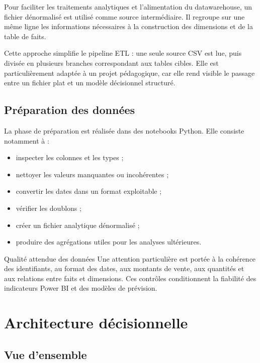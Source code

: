 \documentclass[12pt,a4paper,twoside]{report}
\begin{document}
Pour faciliter les traitements analytiques et l'alimentation du datawarehouse, un fichier dénormalisé est utilisé comme source intermédiaire. Il regroupe sur une même ligne les informations nécessaires à la construction des dimensions et de la table de faits.

Cette approche simplifie le pipeline ETL : une seule source CSV est lue, puis divisée en plusieurs branches correspondant aux tables cibles. Elle est particulièrement adaptée à un projet pédagogique, car elle rend visible le passage entre un fichier plat et un modèle décisionnel structuré.

\section{Préparation des données}

La phase de préparation est réalisée dans des notebooks Python. Elle consiste notamment à :

\begin{itemize}
  \item inspecter les colonnes et les types ;
  \item nettoyer les valeurs manquantes ou incohérentes ;
  \item convertir les dates dans un format exploitable ;
  \item vérifier les doublons ;
  \item créer un fichier analytique dénormalisé ;
  \item produire des agrégations utiles pour les analyses ultérieures.
\end{itemize}

\begin{resultbox}{Qualité attendue des données}
Une attention particulière est portée à la cohérence des identifiants, au format des dates, aux montants de vente, aux quantités et aux relations entre faits et dimensions. Ces contrôles conditionnent la fiabilité des indicateurs Power BI et des modèles de prévision.
\end{resultbox}

\chapter{Architecture décisionnelle}

\section{Vue d'ensemble}
\end{document}
